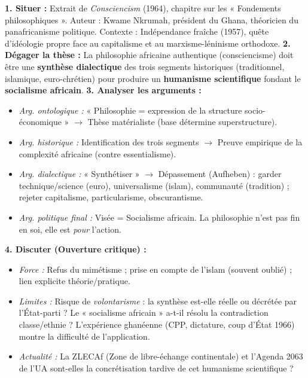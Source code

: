 \documentclass[11pt]{article}
\begin{document}
\begin{exoresolu}
\textbf{1. Situer :} Extrait de \emph{Consciencism} (1964), chapitre sur les « Fondements philosophiques ». Auteur : Kwame Nkrumah, président du Ghana, théoricien du panafricanisme politique. Contexte : Indépendance fraîche (1957), quête d'idéologie propre face au capitalisme et au marxisme-léninisme orthodoxe.
\textbf{2. Dégager la thèse :} La philosophie africaine authentique (consciencisme) doit être une \textbf{synthèse dialectique} des trois segments historiques (traditionnel, islamique, euro-chrétien) pour produire un \textbf{humanisme scientifique} fondant le \textbf{socialisme africain}.
\textbf{3. Analyser les arguments :}
\begin{itemize}
    \item \textit{Arg. ontologique :} « Philosophie = expression de la structure socio-économique » $\rightarrow$ Thèse matérialiste (base détermine superstructure).
    \item \textit{Arg. historique :} Identification des trois segments $\rightarrow$ Preuve empirique de la complexité africaine (contre essentialisme).
    \item \textit{Arg. dialectique :} « Synthétiser » $\rightarrow$ Dépassement (Aufheben) : garder technique/science (euro), universalisme (islam), communauté (tradition) ; rejeter capitalisme, particularisme, obscurantisme.
    \item \textit{Arg. politique final :} Visée = Socialisme africain. La philosophie n'est pas fin en soi, elle est \emph{pour} l'action.
\end{itemize}
\textbf{4. Discuter (Ouverture critique) :}
\begin{itemize}
    \item \textit{Force :} Refus du mimétisme ; prise en compte de l'islam (souvent oublié) ; lien explicite théorie/pratique.
    \item \textit{Limites :} Risque de \emph{volontarisme} : la synthèse est-elle réelle ou décrétée par l'État-parti ? Le « socialisme africain » a-t-il résolu la contradiction classe/ethnie ? L'expérience ghanéenne (CPP, dictature, coup d'État 1966) montre la difficulté de l'application.
    \item \textit{Actualité :} La ZLECAf (Zone de libre-échange continentale) et l'Agenda 2063 de l'UA sont-elles la concrétisation tardive de cet humanisme scientifique ?
\end{itemize}
\end{exoresolu}
\end{document}
